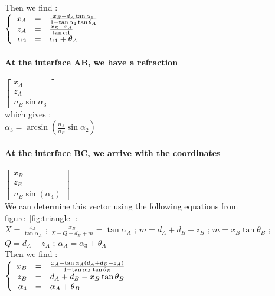 Then we find :\\
$\left \{
   \begin{array}{r c l}
      x_A  & = & \frac{x_E-d_A\tan\alpha_1}{1-\tan\alpha_1\tan\theta_A} \\
      z_A   & = & \frac{x_E-x_A}{\tan\alpha1} \\
      \alpha_2 & = & \alpha_1+\theta_A
   \end{array}
\right.$

\paragraph*{At the interface AB, we have a refraction}
$\begin{bmatrix}x_A \\ z_A \\ n_B\sin\alpha_3\end{bmatrix}$\\

which gives :\\

$\alpha_3 = \arcsin\left(\frac{n_A}{n_B}\sin\alpha_2\right) $

\paragraph*{At the interface BC, we arrive with the coordinates}

$\begin{bmatrix}x_B \\ z_B \\ n_B\sin\left(\alpha_4\right)\end{bmatrix}$\\

We can determine this vector using the following equations from figure~\ref{fig:triangle} :\\

$X = \frac{x_A}{\tan\alpha_A}$ ; $\frac{x_B}{X-Q-d_B+m} = \tan\alpha_A$ ; $m = d_A+d_B-z_B$ ; $m = x_B\tan\theta_B$ ; $Q = d_A-z_A$ ; $\alpha_A = \alpha_3+\theta_A$\\

Then we find :\\
$\left \{
   \begin{array}{r c l}
      x_B  & = & \frac{x_A-\tan\alpha_A\left(d_A+d_B-z_A\right)}{1-\tan\alpha_A\tan\theta_B} \\
      z_B   & = & d_A+d_B-x_B\tan\theta_B \\
      \alpha_4 & = & \alpha_A+\theta_B
   \end{array}
\right.$

